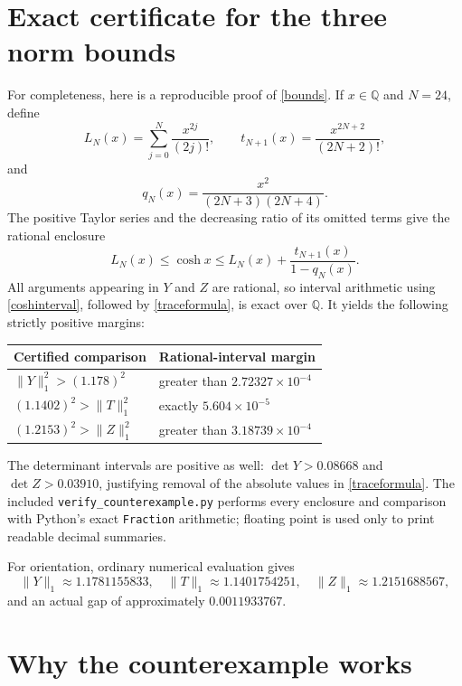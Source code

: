 \documentclass[11pt]{article}
\newcommand{\trnorm}[1]{\lVert#1\rVert_1}
\begin{document}
\section{Exact certificate for the three norm bounds}

For completeness, here is a reproducible proof of \eqref{bounds}.  If
\(x\in\mathbb Q\) and \(N=24\), define
\[
 L_N(x)=\sum_{j=0}^{N}\frac{x^{2j}}{(2j)!},\qquad
 t_{N+1}(x)=\frac{x^{2N+2}}{(2N+2)!},
\]
and
\[
 q_N(x)=\frac{x^2}{(2N+3)(2N+4)}.
\]
The positive Taylor series and the decreasing ratio of its omitted terms
give the rational enclosure
\begin{equation}
 L_N(x)\leq\cosh x\leq
 L_N(x)+\frac{t_{N+1}(x)}{1-q_N(x)}.
 \label{coshinterval}
\end{equation}
All arguments appearing in \(Y\) and \(Z\) are rational, so interval
arithmetic using \eqref{coshinterval}, followed by
\eqref{traceformula}, is exact over \(\mathbb Q\).  It yields the
following strictly positive margins:

\begin{center}
\begin{tabular}{@{}ll@{}}
\toprule
Certified comparison & Rational-interval margin \\
\midrule
\(\trnorm{Y}^2>(1.178)^2\) & greater than \(2.72327\times10^{-4}\) \\
\((1.1402)^2>\trnorm{T}^2\) & exactly \(5.604\times10^{-5}\) \\
\((1.2153)^2>\trnorm{Z}^2\) & greater than \(3.18739\times10^{-4}\) \\
\bottomrule
\end{tabular}
\end{center}

The determinant intervals are positive as well:
\(\det Y>0.08668\) and \(\det Z>0.03910\), justifying removal of the
absolute values in \eqref{traceformula}.  The included
\texttt{verify\_counterexample.py} performs every enclosure and comparison
with Python's exact \texttt{Fraction} arithmetic; floating point is used
only to print readable decimal summaries.

For orientation, ordinary numerical evaluation gives
\[
 \trnorm{Y}\approx1.1781155833,\quad
 \trnorm{T}\approx1.1401754251,\quad
 \trnorm{Z}\approx1.2151688567,
\]
and an actual gap of approximately \(0.0011933767\).

\section{Why the counterexample works}
\end{document}
